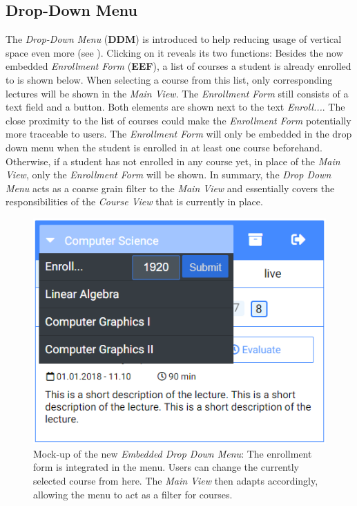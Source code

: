 \subsection{Drop-Down Menu}
\label{section:con:proposals:dropdown}
The \emph{Drop-Down Menu} (\textbf{DDM}) is introduced to help reducing usage of vertical space even more (see ). Clicking on it reveals its two functions: Besides the now embedded \emph{Enrollment Form} (\textbf{EEF}), a list of courses a student is already enrolled to is shown below.
When selecting a course from this list, only corresponding lectures will be shown in the \emph{Main View}.
The \emph{Enrollment Form} still consists of a text field and a button. Both elements are shown next to the text \emph{Enroll...}. The close proximity to the list of courses could make the \emph{Enrollment Form} potentially more traceable to users. The \emph{Enrollment Form} will only be embedded in the drop down menu when the student is enrolled in at least one course beforehand. Otherwise, if a student has not enrolled in any course yet, in place of the \emph{Main View}, only the \emph{Enrollment Form} will be shown.
In summary, the \emph{Drop Down Menu} acts as a coarse grain filter to the \emph{Main View} and essentially covers the responsibilities of the \emph{Course View} that is currently in place.
\begin{figure}
	\begin{center}
		\includegraphics[width=.48\textwidth]{mockups/embedded_drop_down.png}
	\end{center}
	\captionsetup{format=plain}
	\caption{Mock-up of the new \emph{Embedded Drop Down Menu}:
		The enrollment form is integrated in the menu. Users can change the currently selected course from here. The \emph{Main View} then adapts accordingly, allowing the menu to act as a filter for courses.
	}
	\label{figure:embeddeddropdown}
	\vspace*{-2.5cm}
\end{figure}

